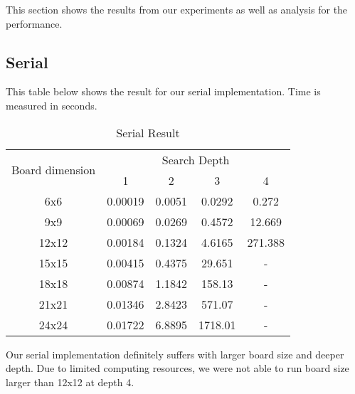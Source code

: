 This section shows the results from our experiments as well as analysis for the performance.

\subsection{Serial}
This table below shows the result for our serial implementation. Time is measured in seconds.
\begin{table}[!htbp]
\centering
\begin{tabular}{|c|c|c|c|c|} 
\hline
\multirow{2}{*}{Board dimension} & \multicolumn{4}{c|}{Search Depth}     \\ 
\cline{2-5}
                                 & 1       & 2      & 3       & 4        \\ 
\hline
6x6                              & 0.00019 & 0.0051 & 0.0292  & 0.272    \\ 
\hline
9x9                              & 0.00069 & 0.0269 & 0.4572  & 12.669   \\ 
\hline
12x12                            & 0.00184 & 0.1324 & 4.6165  & 271.388  \\ 
\hline
15x15                            & 0.00415 & 0.4375 & 29.651  & -        \\ 
\hline
18x18                            & 0.00874 & 1.1842 & 158.13  & -        \\ 
\hline
21x21                            & 0.01346 & 2.8423 & 571.07  & -        \\ 
\hline
24x24                            & 0.01722 & 6.8895 & 1718.01 & -        \\
\hline
\end{tabular}
\caption{Serial Result}
\end{table}

\noindent
Our serial implementation definitely suffers with larger board size and deeper depth. Due to limited computing resources, we were not able to run board size larger than 12x12 at depth 4.

